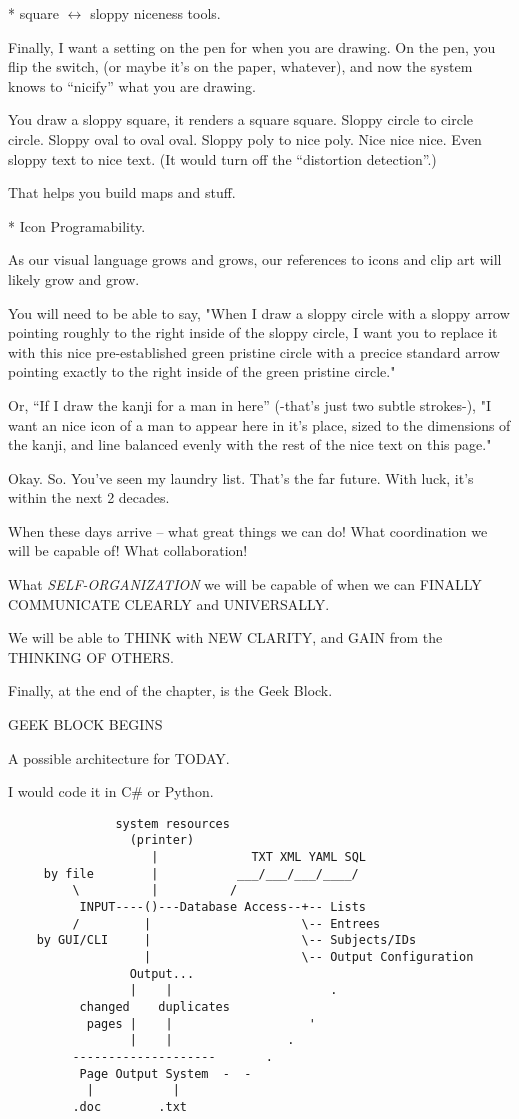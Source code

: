 \documentclass[oneside,fontsize=13]{scrbook}
\begin{document}
* square $\leftrightarrow$ sloppy niceness tools.

Finally, I want a setting on the pen for when you are drawing. On the
pen, you flip the switch, (or maybe it's on the paper, whatever), and
now the system knows to ``nicify'' what you are drawing.

You draw a sloppy square, it renders a square square. Sloppy circle to
circle circle. Sloppy oval to oval oval. Sloppy poly to nice
poly. Nice nice nice. Even sloppy text to nice text. (It would turn
off the ``distortion detection''.)

That helps you build maps and stuff.

* Icon Programability.

As our visual language grows and grows, our references to icons and
clip art will likely grow and grow.

You will need to be able to say, "When I draw a sloppy circle with a
sloppy arrow pointing roughly to the right inside of the sloppy
circle, I want you to replace it with this nice pre-established green
pristine circle with a precice standard arrow pointing exactly to the
right inside of the green pristine circle."

Or, ``If I draw the kanji for a man in here'' (-that's just two subtle
strokes-), "I want an nice icon of a man to appear here in it's place,
sized to the dimensions of the kanji, and line balanced evenly with
the rest of the nice text on this page."

Okay. So.
You've seen my laundry list.
That's the far future. With luck, it's within the next 2 decades.

When these days arrive -- what great things we can do! What coordination
we will be capable of! What collaboration!

What \emph{SELF-ORGANIZATION} we will be capable of when we can FINALLY
COMMUNICATE CLEARLY and UNIVERSALLY.

We will be able to THINK with NEW CLARITY, and GAIN from the THINKING
OF OTHERS.

Finally, at the end of the chapter, is the Geek Block.

GEEK BLOCK BEGINS

A possible architecture for TODAY.

I would code it in C\# or Python.

\begin{verbatim}
               system resources
                 (printer)
                    |             TXT XML YAML SQL
     by file        |           ___/___/___/____/
         \          |          /
          INPUT----()---Database Access--+-- Lists
         /         |                     \-- Entrees
    by GUI/CLI     |                     \-- Subjects/IDs
                   |                     \-- Output Configuration
                 Output...
                 |    |                      .
          changed    duplicates
           pages |    |                   '
                 |    |                .
         --------------------       .
          Page Output System  -  -
           |           |
         .doc        .txt
\end{verbatim}
\end{document}

